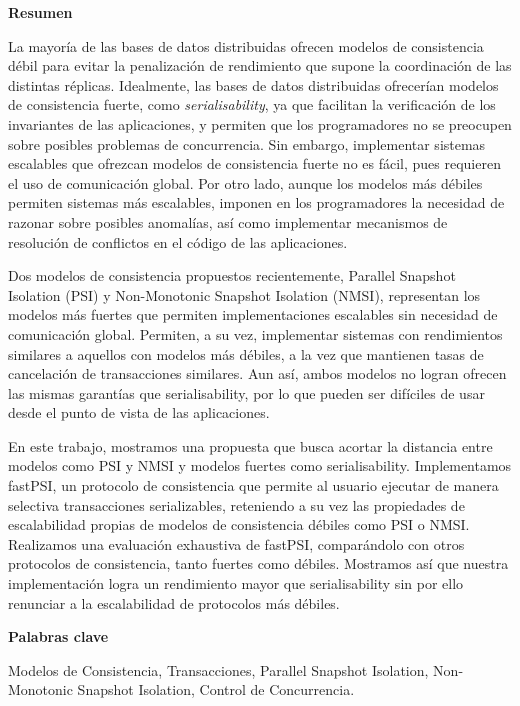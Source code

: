 \newpage

\begin{center}
{\bf \Huge Resumen}
\end{center}

\vspace{1cm}

La mayoría de las bases de datos distribuidas ofrecen modelos de consistencia
débil para evitar la penalización de rendimiento que supone la coordinación de
las distintas réplicas. Idealmente, las bases de datos distribuidas ofrecerían
modelos de consistencia fuerte, como \emph{serialisability}, ya que facilitan la
verificación de los invariantes de las aplicaciones, y permiten que los
programadores no se preocupen sobre posibles problemas de concurrencia. Sin
embargo, implementar sistemas escalables que ofrezcan modelos de consistencia
fuerte no es fácil, pues requieren el uso de comunicación global. Por otro lado,
aunque los modelos más débiles permiten sistemas más escalables, imponen en los
programadores la necesidad de razonar sobre posibles anomalías, así como
implementar mecanismos de resolución de conflictos en el código de las aplicaciones.

Dos modelos de consistencia propuestos recientemente, Parallel Snapshot Isolation
(PSI) y Non-Monotonic Snapshot Isolation (NMSI), representan los modelos más
fuertes que permiten implementaciones escalables sin necesidad de comunicación
global. Permiten, a su vez, implementar sistemas con rendimientos similares a
aquellos con modelos más débiles, a la vez que mantienen tasas de cancelación de
transacciones similares. Aun así, ambos modelos no logran ofrecen las mismas
garantías que serialisability, por lo que pueden ser difíciles de usar desde el
punto de vista de las aplicaciones.

En este trabajo, mostramos una propuesta que busca acortar la distancia entre
modelos como PSI y NMSI y modelos fuertes como serialisability. Implementamos
fastPSI, un protocolo de consistencia que permite al usuario ejecutar de manera
selectiva transacciones serializables, reteniendo a su vez las propiedades de
escalabilidad propias de modelos de consistencia débiles como PSI o NMSI.
Realizamos una evaluación exhaustiva de fastPSI, comparándolo con otros protocolos
de consistencia, tanto fuertes como débiles. Mostramos así que nuestra
implementación logra un rendimiento mayor que serialisability sin por ello
renunciar a la escalabilidad de protocolos más débiles.

\vspace{1cm}

\begin{center}
{\bf \Large Palabras clave}
\end{center}

\vspace{0.5cm}

Modelos de Consistencia, Transacciones, Parallel Snapshot Isolation,
Non-Monotonic Snapshot Isolation, Control de Concurrencia.
